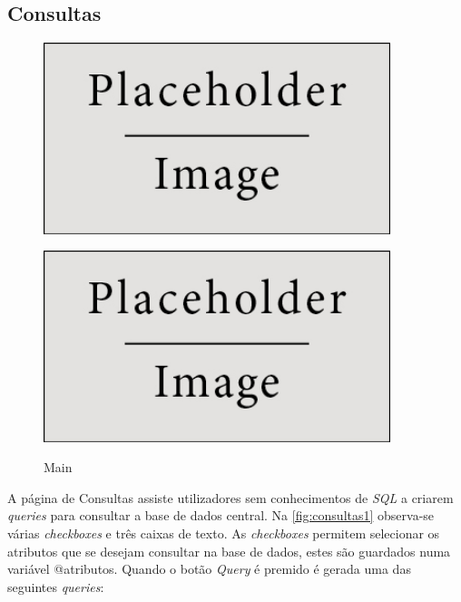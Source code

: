 \documentclass[11pt,twoside,a4paper]{report}
\begin{document}
\subsection{Consultas}
\begin{figure}[H]
	\centering
	\begin{minipage}{.5\textwidth}
		\begin{center}
			\includegraphics[width=0.9\textwidth]{placeholder} %
			\label{fig:consultas1}
		\end{center}
	\end{minipage}%
	\begin{minipage}{.5\textwidth}
		\begin{center}
			\includegraphics[width=0.9\textwidth]{placeholder} %
			\label{fig:consultas2}
		\end{center}
	\end{minipage}
	\caption{Main}
	\label{fig:consultas0}
\end{figure}
A página de Consultas assiste utilizadores sem conhecimentos de \textit{SQL} a criarem \textit{queries} para consultar a base de dados central. Na \autoref{fig:consultas1} observa-se várias \textit{checkboxes} e três caixas de texto. As \textit{checkboxes} permitem selecionar os atributos que se desejam consultar na base de dados, estes são guardados numa variável @atributos. Quando o botão \textit{Query} é premido é gerada uma das seguintes \textit{queries}:\\
\end{document}
